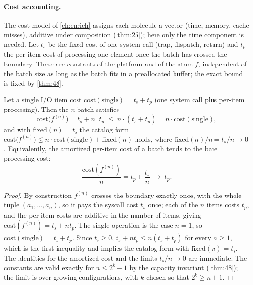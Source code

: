 \paragraph{Cost accounting.}
The cost model of \autoref{ch:enrich} assigns each molecule a vector (time, memory, cache misses), additive under composition (\autoref{thm:25}); here only the time component is needed. Let $t_s$ be the fixed cost of one system call (trap, dispatch, return) and $t_p$ the per-item cost of processing one element once the batch has crossed the boundary. These are constants of the platform and of the atom $f$, independent of the batch size as long as the batch fits in a preallocated buffer; the exact bound is fixed by \autoref{thm:48}.

\begin{theorem}\label{thm:47}
Let a single I/O item cost $\mathrm{cost} (\mathrm{single}) = t_s + t_p$ (one system call plus per-item processing). Then the $n$-batch satisfies
\[
\mathrm{cost}\bigl (f^{(n)}\bigr) = t_s + n \cdot t_p \;\leq\; n \cdot (t_s + t_p) = n \cdot \mathrm{cost} (\mathrm{single}) ,
\]
and with $\mathrm{fixed} (n) = t_s$ the catalog form $\mathrm{cost}\bigl (f^{(n)}\bigr) \leq n \cdot \mathrm{cost} (\mathrm{single}) + \mathrm{fixed} (n)$ holds, where $\mathrm{fixed} (n)/n = t_s/n \to 0$. Equivalently, the amortized per-item cost of a batch tends to the bare processing cost:
\[
\frac{\mathrm{cost} (f^{(n)})}{n} = t_p + \frac{t_s}{n} \;\longrightarrow\; t_p .
\]
\end{theorem}

\begin{proof}
By construction $f^{(n)}$ crosses the boundary exactly once, with the whole tuple $(a_1, \ldots, a_n)$, so it pays the syscall cost $t_s$ once; each of the $n$ items costs $t_p$, and the per-item costs are additive in the number of items, giving $\mathrm{cost} (f^{(n)}) = t_s + n t_p$. The single operation is the case $n = 1$, so $\mathrm{cost} (\mathrm{single}) = t_s + t_p$. Since $t_s \geq 0$, $t_s + n t_p \leq n (t_s + t_p)$ for every $n \geq 1$, which is the first inequality and implies the catalog form with $\mathrm{fixed} (n) = t_s$. The identities for the amortized cost and the limits $t_s/n \to 0$ are immediate. The constants are valid exactly for $n \leq 2^k - 1$ by the capacity invariant (\autoref{thm:48}); the limit is over growing configurations, with $k$ chosen so that $2^k \geq n + 1$.
\end{proof}

